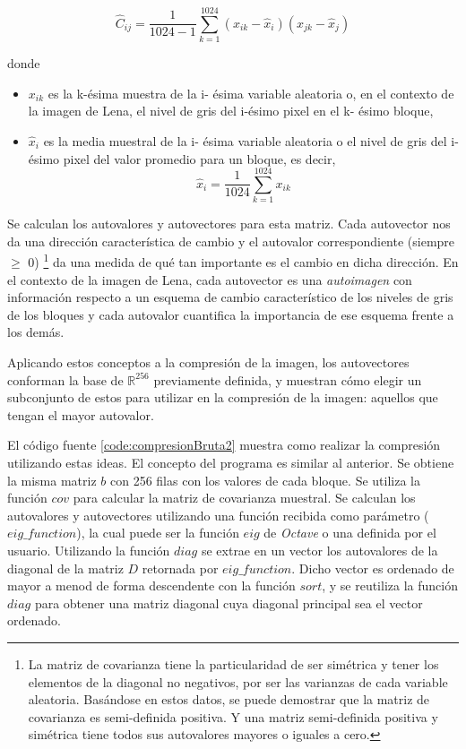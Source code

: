 \documentclass[twocolumn,a4paper,10pt]{article}
\begin{document}
\begin{equation}
    \widehat{C}_{ij} =  \frac{1}{1024 - 1}\sum_{k=1}^{1024} (x_{ik} - \widehat{x}_{i}) (x_{jk} - \widehat{x}_{j})
\end{equation}

donde
\begin{itemize}
    \item $x_{ik}$ es la k-\'esima muestra de la i- \'esima variable aleatoria o, en el contexto de la imagen de Lena, el nivel de gris del i-\'esimo pixel en el 
    k- \'esimo bloque,
    \item $\widehat{x}_{i}$ es la media muestral de la i- \'esima variable aleatoria o el nivel de gris del i-\'esimo pixel del valor promedio para un bloque, es decir,
    \[ \widehat{x}_{i} = \frac{1}{1024} \sum_{k=1}^{1024} x_{ik} \]
\end{itemize}

Se calculan los autovalores y autovectores para esta matriz. Cada autovector nos da una direcci\'on caracter\'istica de cambio y el autovalor correspondiente  (siempre $\geq$ 0) \footnote{La matriz de covarianza tiene la particularidad de ser sim\'etrica y tener los elementos de la diagonal no negativos, por ser las varianzas de cada variable aleatoria. Bas\'andose en estos datos, se puede demostrar que la matriz de covarianza es semi-definida positiva. Y una matriz semi-definida positiva y sim\'etrica tiene todos sus autovalores mayores o iguales a cero.} da una medida de qu\'e tan importante es el cambio en dicha direcci\'on. En el contexto de la imagen de Lena, cada autovector es una \textit{autoimagen} con información respecto a un esquema de cambio caracter\'istico de los niveles de gris de los bloques y cada autovalor cuantifica la importancia de ese esquema frente a los dem\'as.

Aplicando estos conceptos a la compresión de la imagen, los autovectores conforman la base de $\mathbb{R}^{256}$ previamente definida, y muestran cómo elegir un subconjunto de estos para utilizar en la compresión de la imagen: aquellos que tengan el mayor autovalor.

El código fuente \ref{code:compresionBruta2} muestra como realizar la compresión utilizando estas ideas. El concepto del programa es similar al anterior. Se obtiene la misma matriz $b$ con 256 filas con los valores de cada bloque. Se utiliza la función $cov$ para calcular la matriz de covarianza muestral. Se calculan los autovalores y autovectores utilizando una función recibida como parámetro ($eig\_function$), la cual puede ser la función $eig$ de \textit{Octave} o una definida por el usuario. Utilizando la función $diag$ se extrae en un vector los autovalores de la diagonal de la matriz $D$ retornada por $eig\_function$. Dicho vector es ordenado de mayor a menod de forma descendente con la función $sort$, y se reutiliza la función $diag$ para obtener una matriz diagonal cuya diagonal principal sea el vector ordenado.
\end{document}
